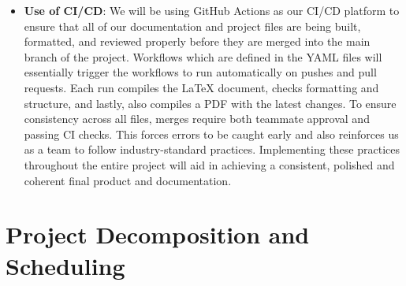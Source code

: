 \documentclass{article}
\begin{document}
\begin{itemize}
 \item \textbf{Use of CI/CD}: We will be using GitHub Actions as our CI/CD platform to ensure that all of our documentation and project files are being built,
formatted, and reviewed properly before they are merged into the main branch of the project. Workflows which are defined in the
YAML files will essentially trigger the workflows to run automatically on pushes and pull requests. Each run compiles the LaTeX
document, checks formatting and structure, and lastly, also compiles a PDF with the latest changes. To ensure consistency across
all files, merges require both teammate approval and passing CI checks. This forces errors to be caught early and also reinforces
us as a team to follow industry-standard practices. Implementing these practices throughout the entire project will aid in
achieving a consistent, polished and coherent final product and documentation.

 \end{itemize}


\section{Project Decomposition and Scheduling}
\end{document}
